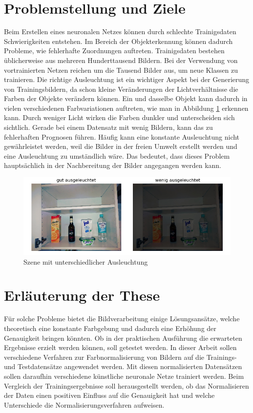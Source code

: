 \section{Problemstellung und Ziele}\label{s.probuziel} 
Beim Erstellen eines neuronalen Netzes können durch schlechte Trainigsdaten Schwierigkeiten entstehen. Im Bereich der Objekterkennung können dadurch Probleme, wie fehlerhafte Zuordnungen auftreten. Trainigsdaten bestehen üblicherweise aus mehreren Hunderttausend Bildern. Bei der Verwendung von vortrainierten Netzen reichen um die Tausend Bilder aus, um neue Klassen zu trainieren. Die richtige Ausleuchtung ist ein wichtiger Aspekt bei der Generierung von Trainingsbildern, da schon kleine Veränderungen der Lichtverhältnisse die Farben der Objekte verändern können. Ein und dasselbe Objekt kann dadurch in vielen verschiedenen Farbvariationen auftreten, wie man in Abbildung \ref{img:problem} erkennen kann. Durch weniger Licht wirken die Farben dunkler und unterscheiden sich sichtlich. Gerade bei einem Datensatz mit wenig Bildern, kann das zu fehlerhaften Prognosen führen. Häufig kann eine konstante Ausleuchtung nicht gewährleistet werden, weil die Bilder in der freien Umwelt erstellt werden und eine Ausleuchtung zu umständlich wäre. Das bedeutet, dass dieses Problem hauptsächlich in der Nachbereitung der Bilder angegangen werden kann.
\begin{figure}
	[h]
	\centering
	\includegraphics[scale=0.7]{Sources/Vergleich.png}
	\caption{Szene mit unterschiedlicher Ausleuchtung}
	\label{img:problem}
\end{figure}
\section{Erläuterung der These}\label{s.these}
Für solche Probleme bietet die Bildverarbeitung einige Lösungsansätze, welche theoretisch eine konstante Farbgebung und dadurch eine Erhöhung der Genauigkeit bringen könnten. Ob in der praktischen Ausführung die erwarteten Ergebnisse erzielt werden können, soll getestet werden. In dieser Arbeit sollen verschiedene Verfahren zur Farbnormalisierung von Bildern auf die Trainings- und Testdatensätze angewendet werden. Mit diesen normalisierten Datensätzen sollen daraufhin verschiedene künstliche neuronale Netze trainiert werden. Beim Vergleich der Trainingsergebnisse soll herausgestellt werden, ob das Normalisieren der Daten einen positiven Einfluss auf die Genauigkeit hat und welche Unterschiede die Normalisierungsverfahren aufweisen.
